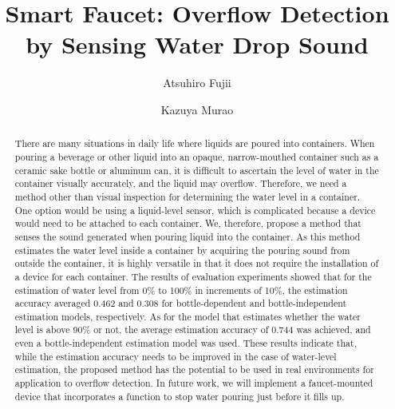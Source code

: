 \documentclass[manuscript,screen,anonymous,review]{acmart}
\begin{document}
\title{Smart Faucet: Overflow Detection by Sensing Water Drop Sound}

\author{Atsuhiro Fujii}

\author{Kazuya Murao}

\renewcommand{\shortauthors}{Fujii and Murao}

\begin{abstract}
  There are many situations in daily life where liquids are poured into containers. When pouring a beverage or other liquid into an opaque, narrow-mouthed container such as a ceramic sake bottle or aluminum can, it is difficult to ascertain the level of water in the container visually accurately, and the liquid may overflow. Therefore, we need a method other than visual inspection for determining the water level in a container. One option would be using a liquid-level sensor, which is complicated because a device would need to be attached to each container. We, therefore, propose a method that senses the sound generated when pouring liquid into the container. As this method estimates the water level inside a container by acquiring the pouring sound from outside the container, it is highly versatile in that it does not require the installation of a device for each container. The results of evaluation experiments showed that for the estimation of water level from 0\% to 100\% in increments of 10\%, the estimation accuracy averaged 0.462 and 0.308 for bottle-dependent and bottle-independent estimation models, respectively. As for the model that estimates whether the water level is above 90\% or not, the average estimation accuracy of 0.744 was achieved, and even a bottle-independent estimation model was used. These results indicate that, while the estimation accuracy needs to be improved in the case of water-level estimation, the proposed method has the potential to be used in real environments for application to overflow detection. In future work, we will implement a faucet-mounted device that incorporates a function to stop water pouring just before it fills up.
\end{abstract}
\end{document}
